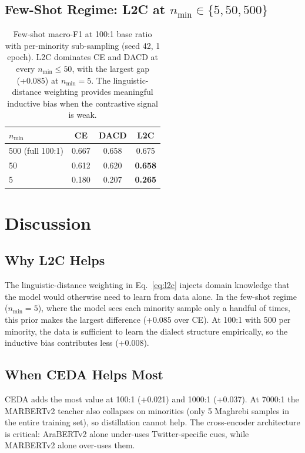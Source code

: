 \documentclass[11pt,a4paper,twocolumn]{article}
\newcommand{\method}{L2C}
\newcommand{\ceda}{CEDA}
\begin{document}
\subsection{Few-Shot Regime: \method{} at $n_{\min} \in \{5, 50, 500\}$}

\begin{table}[t]
\centering
\small
\begin{tabular}{lccc}
\toprule
$n_{\min}$ & CE & DACD & \method{} \\
\midrule
500 (full 100:1)  & 0.667 & 0.658 & 0.675 \\
50                & 0.612 & 0.620 & \textbf{0.658} \\
5                 & 0.180 & 0.207 & \textbf{0.265} \\
\bottomrule
\end{tabular}
\caption{Few-shot macro-F1 at 100:1 base ratio with per-minority
sub-sampling (seed 42, 1 epoch). \method{} dominates CE and DACD at
every $n_{\min}\le 50$, with the largest gap (+0.085) at
$n_{\min}=5$. The linguistic-distance weighting provides
meaningful inductive bias when the contrastive signal is weak.}
\label{tab:fewshot}
\end{table}

\section{Discussion}
\subsection{Why \method{} Helps}
The linguistic-distance weighting in Eq.~\ref{eq:l2c} injects domain
knowledge that the model would otherwise need to learn from data
alone. In the few-shot regime ($n_{\min}=5$), where the model
sees each minority sample only a handful of times, this prior
makes the largest difference (+0.085 over CE). At 100:1 with
500 per minority, the data is sufficient to learn the dialect
structure empirically, so the inductive bias contributes less
(+0.008).

\subsection{When \ceda{} Helps Most}
\ceda{} adds the most value at 100:1 (+0.021) and 1000:1
(+0.037). At 7000:1 the MARBERTv2 teacher also collapses on
minorities (only 5 Maghrebi samples in the entire training set),
so distillation cannot help. The cross-encoder architecture is
critical: AraBERTv2 alone under-uses Twitter-specific cues, while
MARBERTv2 alone over-uses them.
\end{document}
